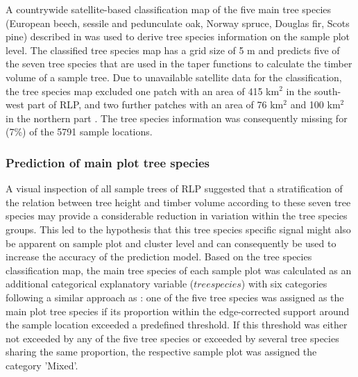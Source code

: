 A countrywide satellite-based classification map of the five main tree species (European beech, sessile and pedunculate oak, Norway spruce, Douglas fir, Scots pine) described in \citet{stoffels2015} was used to derive tree species information on the sample plot level. The classified tree species map has a grid size of 5 m and predicts five of the seven tree species that are used in the \bwi{} taper functions \citep{kublin2013} to calculate the timber volume of a sample tree. Due to unavailable satellite data for the classification, the tree species map excluded one patch with an area of 415 km$^2$ in the south-west part of RLP, and two further patches with an area of 76 km$^2$ and 100 km$^2$ in the northern part \citep{stoffels2015}. The tree species information was consequently missing for  (7\%) of the 5791 sample locations.

\subsubsection*{Prediction of main plot tree species}

A visual inspection of all \bwi{} sample trees of RLP suggested that a stratification of the relation between tree height and timber volume according to these seven tree species may provide a considerable reduction in variation within the tree species groups. This led to the hypothesis that this tree species specific signal might also be apparent on sample plot and cluster level and can consequently be used to increase the accuracy of the prediction model. Based on the tree species classification map, the main tree species of each sample plot was calculated as an additional categorical explanatory variable ($treespecies$) with six categories following a similar approach as \citet{latifi2012}: one of the five tree species was assigned as the main plot tree species if its proportion within the edge-corrected support around the sample location exceeded a predefined threshold. If this threshold was either not exceeded by any of the five tree species or exceeded by several tree species sharing the same proportion, the respective sample plot was assigned the category 'Mixed'. \par


